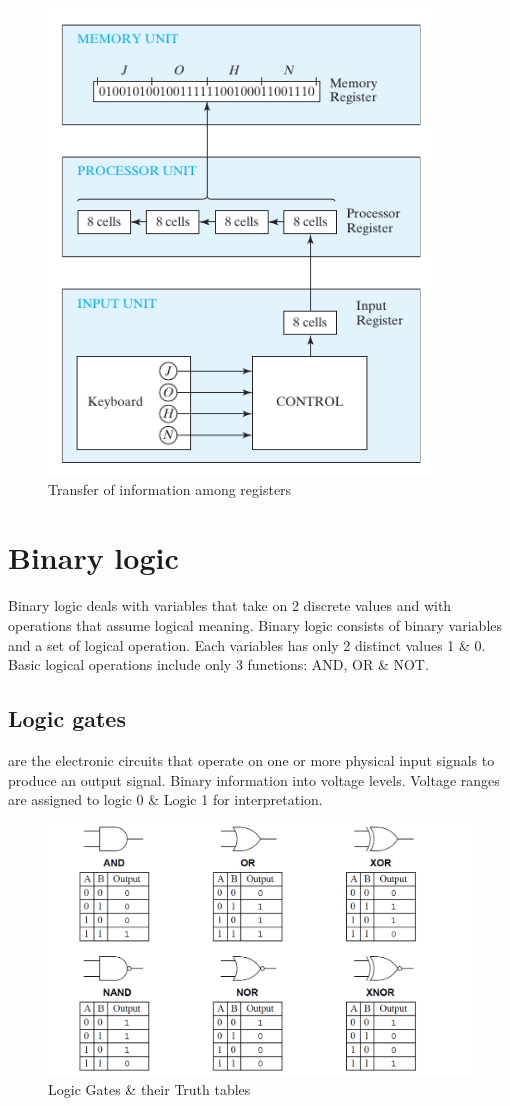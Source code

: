 \begin{figure}[H]
\begin{center}
    \includegraphics[width=4in]{images/RTL.png}
    \caption{Transfer of information among registers}
    \label{RTL}
\end{center}
\end{figure}

\clearpage
\section{Binary logic}
Binary logic deals with variables that take on 2 discrete values and with operations that assume logical meaning. Binary logic consists of binary variables and a set of logical operation. Each variables has only 2 distinct values 1 \& 0. Basic logical operations include only 3 functions: AND, OR \& NOT. 

\subsection{Logic gates} are the electronic circuits that operate on one or more physical input signals to produce an output signal. Binary information 
into voltage levels. Voltage ranges are assigned to logic 0 \& Logic 1 for interpretation.

\begin{figure}[H]
\begin{center}
    \includegraphics[width=\textwidth]{images/LogicGates.png}
    \caption{Logic Gates \& their Truth tables}
    \label{LogicGates}
\end{center}
\end{figure}